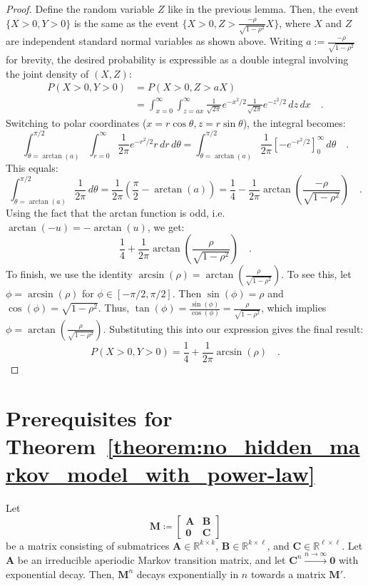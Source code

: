 \documentclass[../../main.tex]{subfiles}
\begin{document}
\begin{proof}
Define the random variable $Z$ like in the previous lemma. Then, the event $\{X>0, Y>0\}$ is the same as the event $\{X>0, Z > \frac{-\rho}{\sqrt{1-\rho^2}}X\}$, where $X$ and $Z$ are independent standard normal variables as shown above. Writing $a := \frac{-\rho}{\sqrt{1-\rho^2}}$ for brevity, the desired probability is expressible as a double integral involving the joint density of $(X,Z)$:
\begin{align*}
    P(X>0, Y>0) &= P(X>0, Z>aX) \\
    &= \int_{x=0}^{\infty} \int_{z=ax}^{\infty} \frac{1}{\sqrt{2\pi}}e^{-x^2/2} \frac{1}{\sqrt{2\pi}}e^{-z^2/2} \,dz\,dx \quad .
\end{align*}
Switching to polar coordinates ($x=r\cos\theta, z=r\sin\theta$), the integral becomes:
$$ \int_{\theta=\arctan(a)}^{\pi/2} \int_{r=0}^{\infty} \frac{1}{2\pi} e^{-r^2/2} r \,dr\,d\theta = \int_{\theta=\arctan(a)}^{\pi/2} \frac{1}{2\pi} \left[-e^{-r^2/2}\right]_0^\infty \,d\theta \quad . $$
This equals:
$$ \int_{\theta=\arctan(a)}^{\pi/2} \frac{1}{2\pi} \,d\theta = \frac{1}{2\pi}\left(\frac{\pi}{2} - \arctan(a)\right) = \frac{1}{4} - \frac{1}{2\pi}\arctan\left(\frac{-\rho}{\sqrt{1-\rho^2}}\right) \quad  .$$
Using the fact that the arctan function is odd, i.e. $\arctan(-u) = -\arctan(u)$, we get:
$$ \frac{1}{4} + \frac{1}{2\pi}\arctan\left(\frac{\rho}{\sqrt{1-\rho^2}}\right) \quad . $$
To finish, we use the identity $\arcsin(\rho) = \arctan\left(\frac{\rho}{\sqrt{1-\rho^2}}\right)$. To see this, let $\phi = \arcsin(\rho)$ for $\phi \in [-\pi/2, \pi/2]$. Then $\sin(\phi) = \rho$ and $\cos(\phi) = \sqrt{1-\rho^2}$. Thus, $\tan(\phi) = \frac{\sin(\phi)}{\cos(\phi)} = \frac{\rho}{\sqrt{1-\rho^2}}$, which implies $\phi = \arctan\left(\frac{\rho}{\sqrt{1-\rho^2}}\right)$.
Substituting this into our expression gives the final result:
$$ P(X>0, Y>0) = \frac{1}{4} + \frac{1}{2\pi}\arcsin(\rho) \quad . $$
\end{proof}

\section{Prerequisites for Theorem~\ref{theorem:no_hidden_markov_model_with_power-law}}
\label{section:prerequisites_for_theorem}
\begin{lemma}
    \label{lemma:exponential_convergence_with_open_states}
    Let
    \[
        \bm{M} \coloneqq
        \begin{bmatrix}
            \bm{A} & \bm{B} \\
            \bm{0} & \bm{C}
        \end{bmatrix}
    \]
    be a matrix consisting of submatrices \( \bm{A} \in \mathbb{R}^{k \times k} \), \( \bm{B} \in \mathbb{R}^{k \times \ell} \), and \( \bm{C} \in \mathbb{R}^{\ell \times \ell} \). Let $\bm{A}$ be an irreducible aperiodic Markov transition matrix, and let $\bm{C}^n \xrightarrow{n \to \infty} \bm{0}$ with exponential decay.
    Then, $\bm{M}^n$ decays exponentially in $n$ towards a matrix $\bm{M}'$.
\end{lemma}
\end{document}
